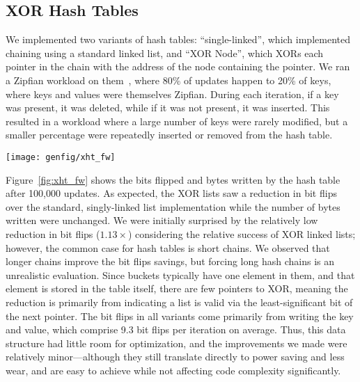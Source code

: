 \subsection{XOR Hash Tables}

We implemented two variants of hash tables: ``single-linked'', which
implemented chaining using a standard linked list, and
``XOR Node'', which
XORs each pointer in the chain with the address of the node containing the pointer.
We ran a Zipfian workload on them~\cite{zipf}, where 80\% of updates happen to
20\% of keys, where keys and values were
themselves Zipfian. During each iteration, if a key was present, it was deleted, while
if it was not present, it was inserted. This resulted in a workload where a
large number of keys were rarely modified, but a smaller percentage were
repeatedly inserted or removed from the hash table.

\begin{SCfigure}
	\centering
	\texttt{[image: genfig/xht\_fw]}
	\caption[XOR hash table characteristics]{Memory characteristics of XOR hash table variants under Zipfian
		workload.}
	\label{fig:xht_fw}
\end{SCfigure}


Figure~\ref{fig:xht_fw} shows the bits flipped and bytes written by the hash
table after 100,000 updates. As expected, the XOR lists saw a reduction in bit
flips over the standard, singly-linked list implementation while the number of
bytes written were unchanged. We were initially surprised by the relatively low
reduction in bit flips ($1.13\times$) considering the relative success of XOR linked
lists; however, the common case for hash tables is short chains. We observed
that longer chains improve the bit flips savings, but forcing long hash chains is
an unrealistic evaluation. Since buckets typically have one element in them, and
that element is stored in the table itself, there are few pointers to XOR,
meaning the reduction is primarily from indicating a list is valid via the
least-significant bit of the next pointer. The bit flips in all variants come
primarily from writing the key and value, which comprise 9.3 bit flips per
iteration on average. Thus, this data structure had little room for optimization,
and the improvements we made were relatively minor---although they still
translate directly to power saving and less wear, and are easy to achieve while
not affecting code complexity significantly.

